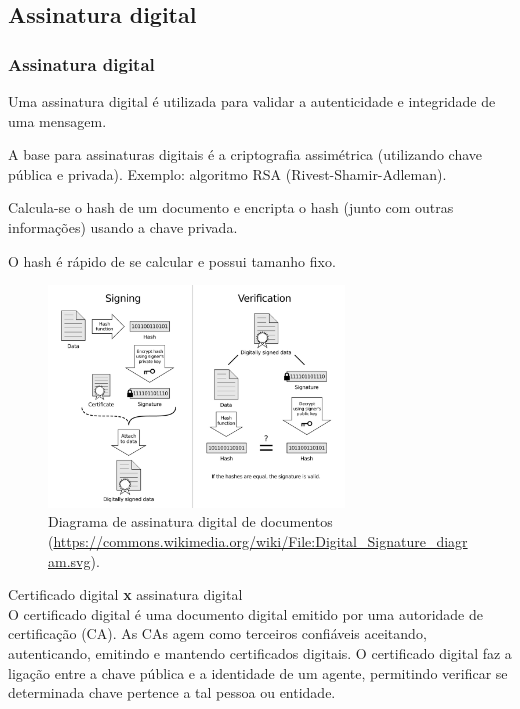\subsection{Assinatura digital}
\begin{frame}[allowframebreaks]
\frametitle{Assinatura digital}
Uma assinatura digital é utilizada para validar a autenticidade e integridade de uma mensagem.

\vspace{3ex}
A base para assinaturas digitais é a criptografia assimétrica (utilizando chave pública e privada).
Exemplo: algoritmo RSA (Rivest-Shamir-Adleman).

\vspace{3ex}
Calcula-se o hash de um documento e encripta o hash (junto com outras informações) usando a chave privada. 

\vspace{3ex} 
O hash é rápido de se calcular e possui tamanho fixo.

\begin{figure}[h]
\centering
\includegraphics[width=0.7\textwidth,height=0.7\textheight,keepaspectratio]{figures/digitalsignaturediagram.pdf}
\caption{Diagrama de assinatura digital de documentos (\url{https://commons.wikimedia.org/wiki/File:Digital_Signature_diagram.svg}).}
\label{fig-digi-sign}
\end{figure}

Certificado digital \textbf{x} assinatura digital\\
O certificado digital é uma documento digital emitido por uma autoridade de certificação (CA). 
As CAs agem como terceiros confiáveis aceitando, autenticando, emitindo e mantendo certificados digitais. 
O certificado digital faz a ligação entre a chave pública e a identidade de um agente, permitindo
verificar se determinada chave pertence a tal pessoa ou entidade.

\end{frame}




